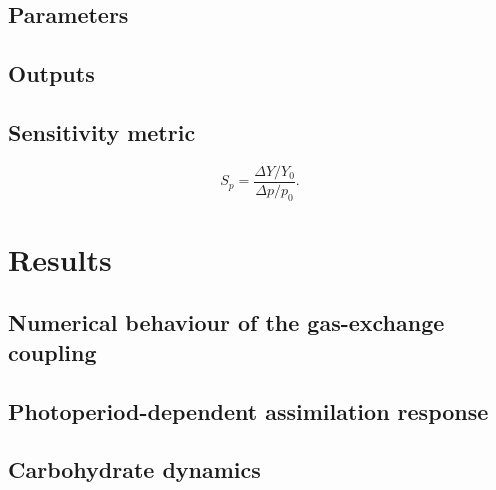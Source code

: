 \documentclass[a4paper,fleqn]{cas-dc}
\begin{document}

\subsection{Parameters}

\subsection{Outputs}

\subsection{Sensitivity metric}

\begin{equation}
S_p =
\frac{\Delta Y / Y_0}
{\Delta p / p_0}.
\end{equation}

\section{Results}
\label{sec:results}


\subsection{Numerical behaviour of the gas-exchange coupling}

\subsection{Photoperiod-dependent assimilation response}

\subsection{Carbohydrate dynamics}
\end{document}
